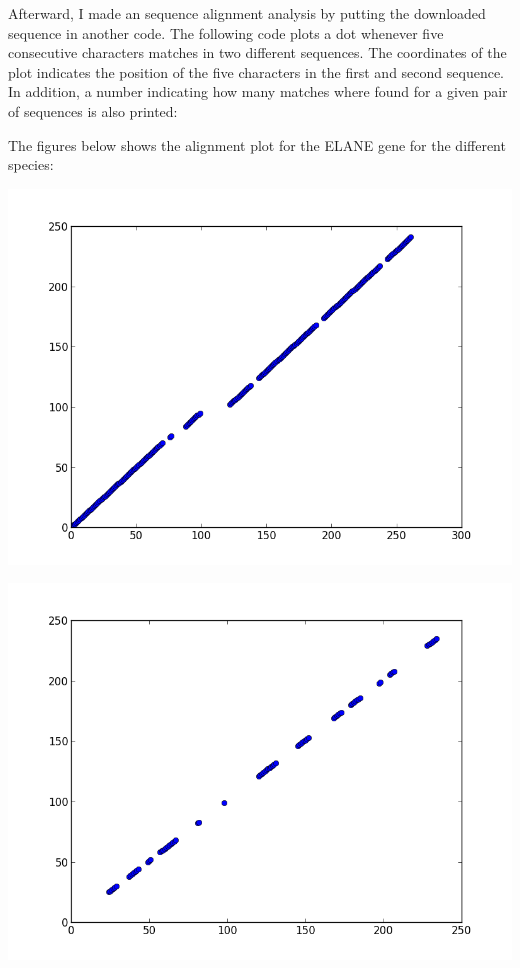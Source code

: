 \documentclass[%
]
{scrartcl}
\theoremstyle{plain}
\begin{document}
Afterward, I made an sequence alignment analysis by putting the downloaded sequence in another code. The following code plots a dot whenever five consecutive characters matches in two different sequences. The coordinates of the plot indicates the position of the five characters in the first and second sequence. In addition, a number indicating how many matches where found for a given pair of sequences is also printed:



The figures below shows the alignment plot for the ELANE gene for the different species:

\begin{center}
\centering
\includegraphics[width=0.6\linewidth]{../HumanChimpanzeeAlignment.png}
\end{center}

\begin{center}
\centering
\includegraphics[width=0.6\linewidth]{../HumanDogAlignment.png}
\end{center}
\end{document}
